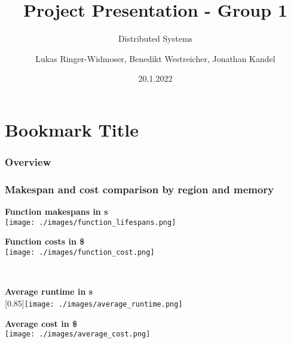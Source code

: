 \documentclass[11pt,t,usepdftitle=false,aspectratio=169]{beamer}
\title[Project Presentation]{Project Presentation - Group 1}
\subtitle{Distributed Systems}
\author{Lukas Ringer-Widmoser, Benedikt Westreicher, Jonathan Kandel}
\date{20.1.2022}
\begin{document}
\section{Bookmark Title}


\begin{frame}
\frametitle{Overview}


\end{frame}

\begin{frame}
	\frametitle{Makespan and cost comparison by region and memory}

	\hfill\vline\hfill
	\begin{minipage}[t]{0.48\textwidth}
		\textbf{{\small Function makespans in s}\vspace{1mm}}\\
	\texttt{[image: ./images/function\_lifespans.png]}
	\end{minipage}
	\hfill\vline\hfill
	\begin{minipage}[t]{0.48\textwidth}
		\textbf{{\small Function costs in \$}\vspace{1mm}}\\
	\texttt{[image: ./images/function\_cost.png]}
	\end{minipage}\\
\vspace{2mm}
	\hfill\vline\hfill
	\begin{minipage}[t]{0.48\textwidth}
		\textbf{{\small Average runtime in s}\vspace{1mm}}\\
	\scalebox{1}[0.85]{\texttt{[image: ./images/average\_runtime.png]}}
	\end{minipage}
	\hfill\vline\hfill
	\begin{minipage}[t]{0.48\textwidth}
		\textbf{{\small Average cost in \$}\vspace{1mm}}\\
		\texttt{[image: ./images/average\_cost.png]}
	\end{minipage}
	
\end{frame}
\end{document}
